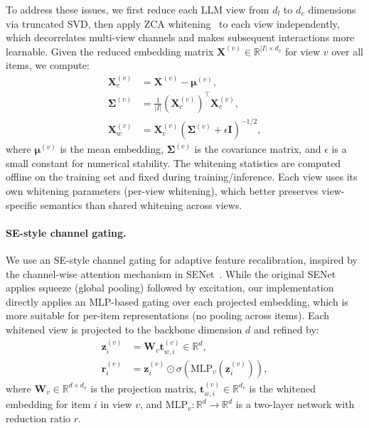\documentclass[sigconf,natbib=true]{acmart}
\newcommand{\llm}{\textsc{LLM}\xspace}
\begin{document}
To address these issues, we first reduce each \llm view from $d_l$ to $d_v$
dimensions via truncated SVD, then apply ZCA whitening~\cite{kessy2018zca} to each view
independently, which decorrelates multi-view channels and makes
subsequent interactions more learnable.
Given the reduced embedding matrix $\mathbf{X}^{(v)} \in \mathbb{R}^{|I| \times d_v}$
for view $v$ over all items, we compute:
\begin{align}
  \mathbf{X}_c^{(v)} &= \mathbf{X}^{(v)} - \boldsymbol{\mu}^{(v)}, \\
  \boldsymbol{\Sigma}^{(v)} &= \frac{1}{|I|}(\mathbf{X}_c^{(v)})^\top \mathbf{X}_c^{(v)}, \\
  \mathbf{X}_w^{(v)} &= \mathbf{X}_c^{(v)} (\boldsymbol{\Sigma}^{(v)} + \epsilon \mathbf{I})^{-1/2},
\end{align}
where $\boldsymbol{\mu}^{(v)}$ is the mean embedding, $\boldsymbol{\Sigma}^{(v)}$
is the covariance matrix, and $\epsilon$ is a small constant for numerical
stability. The whitening statistics are computed offline on the training set
and fixed during training/inference. Each view uses its own whitening
parameters (per-view whitening), which better preserves view-specific
semantics than shared whitening across views.

\paragraph{SE-style channel gating.}
We use an SE-style channel gating for adaptive feature
recalibration, inspired by the channel-wise attention mechanism
in SENet~\cite{hu2018senet}. While the original SENet applies
squeeze (global pooling) followed by excitation, our
implementation directly applies an MLP-based gating over each
projected embedding, which is more suitable for per-item
representations (no pooling across items). Each whitened view
is projected to the backbone dimension $d$ and refined by:
\begin{align}
  \mathbf{z}_i^{(v)} &= \mathbf{W}_v \mathbf{t}_{w,i}^{(v)} \in \mathbb{R}^d,\\
  \mathbf{r}_i^{(v)} &= \mathbf{z}_i^{(v)} \odot \sigma(\mathrm{MLP}_v(\mathbf{z}_i^{(v)})),
\end{align}
where $\mathbf{W}_v \in \mathbb{R}^{d \times d_v}$ is the projection matrix,
$\mathbf{t}_{w,i}^{(v)} \in \mathbb{R}^{d_v}$ is the whitened embedding for
item $i$ in view $v$, and $\mathrm{MLP}_v: \mathbb{R}^d \to \mathbb{R}^d$ is a two-layer
network with reduction ratio $r$.
\end{document}
